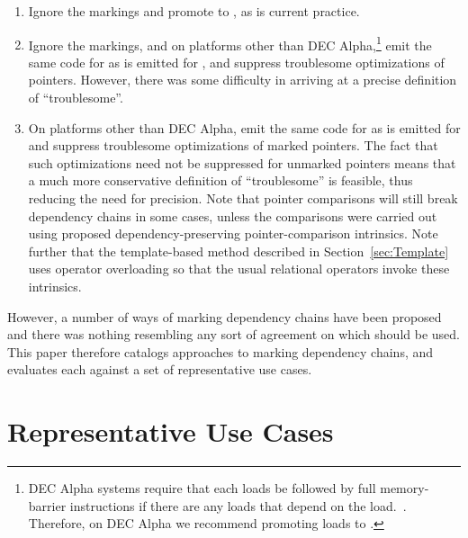 \documentclass[letterpaper,10pt]{article}
\begin{document}
\begin{enumerate}
\item	Ignore the markings and promote 
	to , as is current practice.
\item	Ignore the markings, and on platforms other than DEC Alpha,\footnote{
	DEC Alpha systems require that each  loads
	be followed by full memory-barrier instructions if there are any
	loads that depend on the 
	load.~\cite{Compaq01,ALPHA95}.
	Therefore, on DEC Alpha we recommend promoting
	 loads to .}
	emit the same code for
	 as is emitted for
	, and suppress troublesome
	optimizations of pointers.
	However, there was some difficulty in arriving at a precise
	definition of ``troublesome''.
\item	On platforms other than DEC Alpha, emit the same code for
	 as is emitted for 
	and suppress troublesome optimizations of marked pointers.
	The fact that such optimizations need not be suppressed
	for unmarked pointers means that a much more conservative
	definition of ``troublesome'' is feasible, thus reducing
	the need for precision.
	Note that pointer comparisons will still break dependency chains
	in some cases, unless the comparisons were carried out using
	proposed dependency-preserving pointer-comparison intrinsics.
	Note further that the template-based method described in
	Section~\ref{sec:Template}
	uses operator overloading so that the usual relational
	operators invoke these intrinsics.
\end{enumerate}

However, a number of ways of marking dependency chains have been
proposed and there was nothing resembling any sort of agreement
on which should be used.
This paper therefore catalogs approaches to marking dependency chains,
and evaluates each against a set of representative use cases.

\section{Representative Use Cases}
\label{sec:Representative Use Cases}
\end{document}
